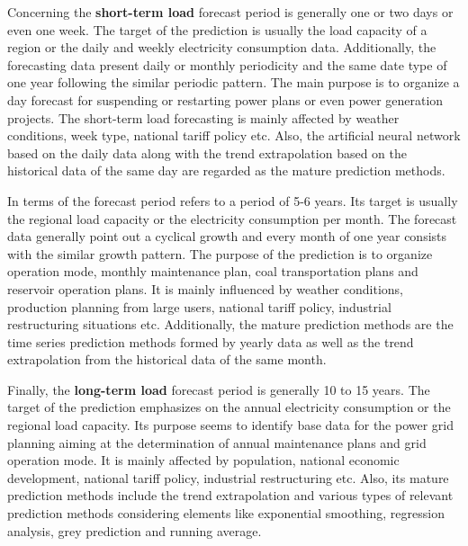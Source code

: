 \par Concerning the \textbf{short-term load} forecast period is generally one or two days or even one week. The target of the prediction is usually the load capacity of a region or the daily and weekly electricity consumption data. Additionally, the forecasting data present daily or monthly periodicity and the same date type of one year following the similar periodic pattern. The main purpose is to organize a day forecast for suspending or restarting power plans or even power generation projects. The short-term load forecasting is mainly affected by weather conditions, week type, national tariff policy etc. Also, the artificial neural network based on the daily data along with the trend extrapolation based on the historical data of the same day are regarded as the mature prediction methods.
\par In terms of the  forecast period refers to a period of 5-6 years. Its target is usually the regional load capacity or the electricity consumption per month. The forecast data generally point out a cyclical growth and every month of one year consists with the similar growth pattern. The purpose of the prediction is to organize operation mode, monthly maintenance plan, coal transportation plans and reservoir operation plans. It is mainly influenced by weather conditions, production planning from large users, national tariff policy, industrial restructuring situations etc. Additionally, the mature prediction methods are the time series prediction methods formed by yearly data as well as the trend  extrapolation from the historical data of the same month.
\par Finally, the \textbf{long-term load} forecast period is generally 10 to 15 years. The target of the prediction emphasizes on the annual electricity consumption or the regional load capacity. Its purpose seems to identify base data for the power grid planning aiming at the determination of annual maintenance plans and grid operation mode. It is mainly affected by population, national economic development, national tariff policy, industrial restructuring etc. Also, its mature prediction methods include the trend extrapolation and various types of relevant prediction methods considering elements like exponential smoothing, regression analysis, grey prediction and running average.
